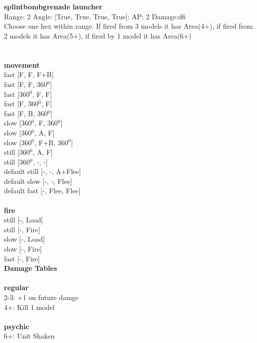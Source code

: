 \ \\

\ \\
{\bf splintbombgrenade launcher } \\



Range: 2  Angle: [True, True, True, True]: AP: 2 Damage:d6 \\
Choose one hex within range. If fired from 3 models it has Area(4+), if fired from 2 models it has Area(5+), if fired by 1 model it has Area(6+)\\ 




 
\ \\



\ \\ {\bf movement } \\
fast [F, F, F+B] \\
fast [F, F, 360$^0$] \\
fast [360$^0$, F, F] \\
fast [F, 360$^0$, F] \\
fast [F, B, 360$^0$] \\
slow [360$^0$, F, 360$^0$] \\
slow [360$^0$, A, F] \\
slow [360$^0$, F+B, 360$^0$] \\
still [360$^0$, A, F] \\
still [360$^0$, -, -] \\
default still [-, -, A+Flee] \\
default slow [-, -, Flee] \\
default fast [-, Flee, Flee] \\
\ \\ {\bf fire } \\
still [-, Load] \\
still [-, Fire] \\
slow [-, Load] \\
slow [-, Fire] \\
fast [-, Fire] \\


{\bf Damage Tables} \\
\ \\ {\bf regular } \\
2-3: +1 on future damge \\
4+: Kill 1 model \\
\ \\ {\bf psychic } \\
6+: Unit Shaken \\










